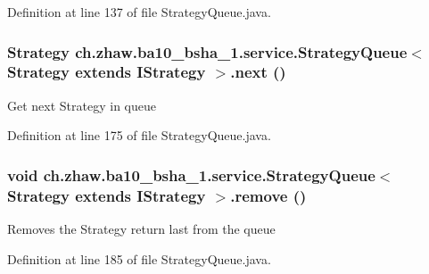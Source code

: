 Definition at line 137 of file StrategyQueue.java.\hypertarget{classch_1_1zhaw_1_1ba10__bsha__1_1_1service_1_1StrategyQueue_3_01Strategy_01extends_01IStrategy_01_4_accac6ec5804bd23cc0f7d8839ef613ad}{
\subsubsection[{next}]{\setlength{\rightskip}{0pt plus 5cm}Strategy ch.zhaw.ba10\_\-bsha\_\-1.service.StrategyQueue$<$ Strategy extends {\bf IStrategy} $>$.next ()}}
\label{classch_1_1zhaw_1_1ba10__bsha__1_1_1service_1_1StrategyQueue_3_01Strategy_01extends_01IStrategy_01_4_accac6ec5804bd23cc0f7d8839ef613ad}
Get next Strategy in queue 

Definition at line 175 of file StrategyQueue.java.\hypertarget{classch_1_1zhaw_1_1ba10__bsha__1_1_1service_1_1StrategyQueue_3_01Strategy_01extends_01IStrategy_01_4_a74b39a093152962d2449bbd2951f5f56}{
\subsubsection[{remove}]{\setlength{\rightskip}{0pt plus 5cm}void ch.zhaw.ba10\_\-bsha\_\-1.service.StrategyQueue$<$ Strategy extends {\bf IStrategy} $>$.remove ()}}
\label{classch_1_1zhaw_1_1ba10__bsha__1_1_1service_1_1StrategyQueue_3_01Strategy_01extends_01IStrategy_01_4_a74b39a093152962d2449bbd2951f5f56}
Removes the Strategy return last from the queue 

Definition at line 185 of file StrategyQueue.java.

